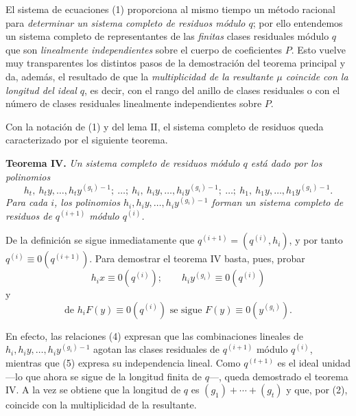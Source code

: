 El sistema de ecuaciones (1) proporciona al mismo tiempo un método racional para \emph{determinar un sistema completo de residuos módulo $q$}; por ello entendemos un sistema completo de representantes de las \emph{finitas} clases residuales módulo $q$ que son \emph{linealmente independientes} sobre el cuerpo de coeficientes $P$. Esto vuelve muy transparentes los distintos pasos de la demostración del teorema principal y da, además, el resultado de que la \emph{multiplicidad de la resultante $\mu$ coincide con la longitud del ideal $q$}, es decir, con el rango del anillo de clases residuales o con el número de clases residuales linealmente independientes sobre $P$.

Con la notación de (1) y del lema II, el sistema completo de residuos queda caracterizado por el siguiente teorema.

\textbf{Teorema IV.} \emph{Un sistema completo de residuos módulo $q$ está dado por los polinomios}
\[
h_t,\ h_ty,\ldots,h_ty^{(g_t)-1};\ \ldots;\ h_i,\ h_iy,\ldots,h_iy^{(g_i)-1};\ \ldots;\ h_1,\ h_1y,\ldots,h_1y^{(g_1)-1}.
\]
\emph{Para cada $i$, los polinomios $h_i,h_iy,\ldots,h_iy^{(g_i)-1}$ forman un sistema completo de residuos de $q^{(i+1)}$ módulo $q^{(i)}$.}

De la definición se sigue inmediatamente que $q^{(i+1)}=(q^{(i)},h_i)$, y por tanto $q^{(i)}\equiv0(q^{(i+1)})$. Para demostrar el teorema IV basta, pues, probar
\begin{equation}
\tag{4}
h_ix\equiv0(q^{(i)});\qquad h_iy^{(g_i)}\equiv0(q^{(i)})
\end{equation}
y
\begin{equation}
\tag{5}
\text{de }h_iF(y)\equiv0(q^{(i)})\text{ se sigue }F(y)\equiv0(y^{(g_i)}).
\end{equation}

En efecto, las relaciones (4) expresan que las combinaciones lineales de $h_i,h_iy,\ldots,h_iy^{(g_i)-1}$ agotan las clases residuales de $q^{(i+1)}$ módulo $q^{(i)}$, mientras que (5) expresa su independencia lineal. Como $q^{(t+1)}$ es el ideal unidad ---lo que ahora se sigue de la longitud finita de $q$---, queda demostrado el teorema IV. A la vez se obtiene que la longitud de $q$ es $(g_1)+\cdots+(g_t)$ y que, por (2), coincide con la multiplicidad de la resultante.

